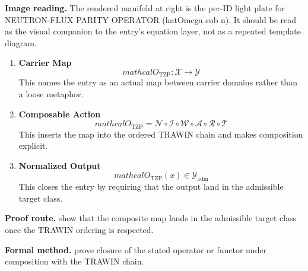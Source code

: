 \begin{samepage}
\noindent\begin{minipage}[t]{0.45\linewidth}
\vspace{0pt}
\raggedright
\scriptsize\textbf{Image reading.} The rendered manifold at right is the per-ID light plate for NEUTRON-FLUX PARITY OPERATOR (hatOmega sub n). It should be read as the visual companion to the entry's equation layer, not as a repeated template diagram.\par
\end{minipage}\hfill
\begin{minipage}[t]{0.53\linewidth}
\vspace*{-0.10in}
\raggedright
{}
\end{minipage}
\end{samepage}

\clearpage


\begin{enumerate}[leftmargin=1.6em,itemsep=9pt,topsep=6pt]
\item \textbf{Carrier Map}
\[
mathcal{O}_{\mathrm{TZP}} : \mathcal{X} \to \mathcal{Y}
\]
This names the entry as an actual map between carrier domains rather than a loose metaphor.

\item \textbf{Composable Action}
\[
mathcal{O}_{\mathrm{TZP}} = \mathcal{N}\circ \mathcal{I}\circ \mathcal{W}\circ \mathcal{A}\circ \mathcal{R}\circ \mathcal{T}
\]
This inserts the map into the ordered TRAWIN chain and makes composition explicit.

\item \textbf{Normalized Output}
\[
mathcal{O}_{\mathrm{TZP}}(x) \in \mathcal{Y}_{\mathrm{adm}}
\]
This closes the entry by requiring that the output land in the admissible target class.
\end{enumerate}

\textbf{Proof route.} show that the composite map lands in the admissible target class once the TRAWIN ordering is respected.

\textbf{Formal method.} prove closure of the stated operator or functor under composition with the TRAWIN chain.

\medskip
{}

